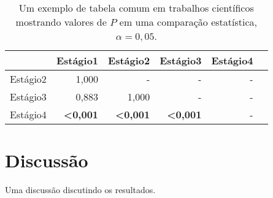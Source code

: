 \begin{table}[htbp]
  \caption[Tabelas com valores de $P$]{Um exemplo de tabela comum em trabalhos científicos mostrando valores de $P$ em uma comparação estatística, $\alpha=0,05$.}
  \label{tab:areap}
  \vspace{1em}
  \centering
  \begin{tabular}{l r r r r r}
    \toprule
     ~		&	Estágio1	&	Estágio2	&	Estágio3	&	Estágio4\\
     \midrule
     Estágio2	&	1,000		&	-		&	-		&	-\\
     Estágio3	&	0,883		&	1,000		&	-		&	-\\
     Estágio4	&	\textbf{<0,001}	&	\textbf{<0,001}	&	\textbf{<0,001}	&	-\\
     \bottomrule
   \end{tabular}
 \end{table}

\section{Discussão}\label{cap3:disc}

Uma discussão discutindo os resultados.

